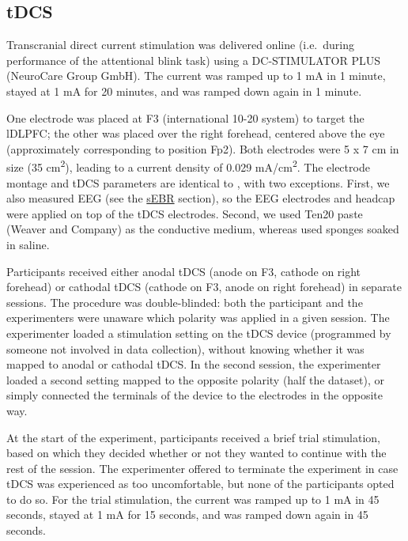 \documentclass[11pt,]{memoir}
\begin{document}
\hypertarget{AB_sEBR-tDCS}{%
\subsection{tDCS}\label{AB_sEBR-tDCS}}

Transcranial direct current stimulation was delivered online (i.e.~during performance of the attentional blink task) using a DC-STIMULATOR PLUS (NeuroCare Group GmbH). The current was ramped up to 1 mA in 1 minute, stayed at 1 mA for 20 minutes, and was ramped down again in 1 minute.

One electrode was placed at F3 (international 10-20 system) to target the lDLPFC; the other was placed over the right forehead, centered above the eye (approximately corresponding to position Fp2). Both electrodes were 5 x 7 cm in size (35 cm\textsuperscript{2}), leading to a current density of 0.029 mA/cm\textsuperscript{2}. The electrode montage and tDCS parameters are identical to \textcite{London2015}, with two exceptions. First, we also measured EEG (see the \protect\hyperlink{AB_sEBR-sEBR}{sEBR} section), so the EEG electrodes and headcap were applied on top of the tDCS electrodes. Second, we used Ten20 paste (Weaver and Company) as the conductive medium, whereas \textcite{London2015} used sponges soaked in saline.

Participants received either anodal tDCS (anode on F3, cathode on right forehead) or cathodal tDCS (cathode on F3, anode on right forehead) in separate sessions. The procedure was double-blinded: both the participant and the experimenters were unaware which polarity was applied in a given session. The experimenter loaded a stimulation setting on the tDCS device (programmed by someone not involved in data collection), without knowing whether it was mapped to anodal or cathodal tDCS. In the second session, the experimenter loaded a second setting mapped to the opposite polarity (half the dataset), or simply connected the terminals of the device to the electrodes in the opposite way.

At the start of the experiment, participants received a brief trial stimulation, based on which they decided whether or not they wanted to continue with the rest of the session. The experimenter offered to terminate the experiment in case tDCS was experienced as too uncomfortable, but none of the participants opted to do so. For the trial stimulation, the current was ramped up to 1 mA in 45 seconds, stayed at 1 mA for 15 seconds, and was ramped down again in 45 seconds.
\end{document}
